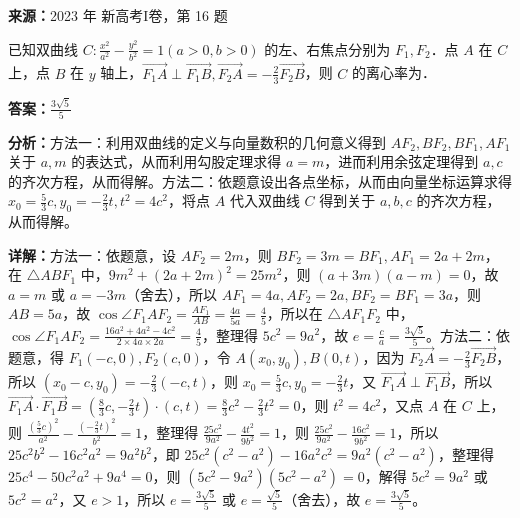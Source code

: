 \begin{question}[points=5]
\textbf{来源：}2023 年 新高考I卷，第 16 题\par
已知双曲线 $C:\frac{x^2}{a^2}-\frac{y^2}{b^2}=1(a>0,b>0)$ 的左、右焦点分别为 $F_1, F_2$．点 $A$ 在 $C$ 上，点 $B$ 在 $y$ 轴上，$\overrightarrow{F_1A}\perp\overrightarrow{F_1B}, \overrightarrow{F_2A}=-\frac{2}{3}\overrightarrow{F_2B}$，则 $C$ 的离心率为．
\begin{solution}
\textbf{答案：}$\frac{3\sqrt{5}}{5}$

\textbf{分析：}方法一：利用双曲线的定义与向量数积的几何意义得到 $AF_2, BF_2, BF_1, AF_1$ 关于 $a, m$ 的表达式，从而利用勾股定理求得 $a=m$，进而利用余弦定理得到 $a,c$ 的齐次方程，从而得解。方法二：依题意设出各点坐标，从而由向量坐标运算求得 $x_0=\frac{5}{3}c, y_0=-\frac{2}{3}t, t^2=4c^2$，将点 $A$ 代入双曲线 $C$ 得到关于 $a,b,c$ 的齐次方程，从而得解。

\textbf{详解：}方法一：依题意，设 $AF_2=2m$，则 $BF_2=3m=BF_1, AF_1=2a+2m$，在 $\triangle ABF_1$ 中，$9m^2+(2a+2m)^2=25m^2$，则 $(a+3m)(a-m)=0$，故 $a=m$ 或 $a=-3m$（舍去），所以 $AF_1=4a, AF_2=2a, BF_2=BF_1=3a$，则 $AB=5a$，故 $\cos\angle F_1AF_2=\frac{AF_1}{AB}=\frac{4a}{5a}=\frac{4}{5}$，所以在 $\triangle AF_1F_2$ 中，$\cos\angle F_1AF_2=\frac{16a^2+4a^2-4c^2}{2\times4a\times2a}=\frac{4}{5}$，整理得 $5c^2=9a^2$，故 $e=\frac{c}{a}=\frac{3\sqrt{5}}{5}$。方法二：依题意，得 $F_1(-c,0), F_2(c,0)$，令 $A(x_0,y_0), B(0,t)$，因为 $\overrightarrow{F_2A}=-\frac{2}{3}\overrightarrow{F_2B}$，所以 $(x_0-c, y_0)=-\frac{2}{3}(-c,t)$，则 $x_0=\frac{5}{3}c, y_0=-\frac{2}{3}t$，又 $\overrightarrow{F_1A}\perp\overrightarrow{F_1B}$，所以 $\overrightarrow{F_1A}\cdot\overrightarrow{F_1B}=(\frac{8}{3}c, -\frac{2}{3}t)\cdot(c,t)=\frac{8}{3}c^2-\frac{2}{3}t^2=0$，则 $t^2=4c^2$，又点 $A$ 在 $C$ 上，则 $\frac{(\frac{5}{3}c)^2}{a^2}-\frac{(-\frac{2}{3}t)^2}{b^2}=1$，整理得 $\frac{25c^2}{9a^2}-\frac{4t^2}{9b^2}=1$，则 $\frac{25c^2}{9a^2}-\frac{16c^2}{9b^2}=1$，所以 $25c^2b^2-16c^2a^2=9a^2b^2$，即 $25c^2(c^2-a^2)-16a^2c^2=9a^2(c^2-a^2)$，整理得 $25c^4-50c^2a^2+9a^4=0$，则 $(5c^2-9a^2)(5c^2-a^2)=0$，解得 $5c^2=9a^2$ 或 $5c^2=a^2$，又 $e>1$，所以 $e=\frac{3\sqrt{5}}{5}$ 或 $e=\frac{\sqrt{5}}{5}$（舍去），故 $e=\frac{3\sqrt{5}}{5}$。
\end{solution}
\end{question}

